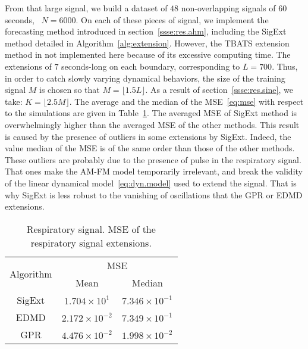 From that large signal, we build a dataset of $48$ non-overlapping signals of 60 seconds, \ie~$N=6000$. On each of these pieces of signal, we implement the forecasting method introduced in section~\ref{ssse:res.ahm}, including the {\sf SigExt} method detailed in Algorithm~\ref{alg:extension}. However, the TBATS extension method in not implemented here because of its excessive computing time. The extensions of $7$ seconds-long on each boundary, corresponding to $L =700$. Thus, in order to catch slowly varying dynamical behaviors, the size of the training signal $M$ is chosen so that $M=\lfloor 1.5L\rfloor$. As a result of section~\ref{ssse:res.sine}, we take: $K=\lfloor2.5M\rfloor$. The average and the median of the MSE~\eqref{eq:mse} with respect to the simulations are given in Table~\ref{tab:mse}. The averaged MSE of {\sf SigExt} method is overwhelmingly higher than the averaged MSE of the other methods. This result is caused by the presence of outliers in some extensions by {\sf SigExt}. Indeed, the value median of the MSE is of the same order than those of the other methods. These outliers are probably due to the presence of pulse in the respiratory signal. That ones make the AM-FM model temporarily irrelevant, and break the validity of the linear dynamical model~\eqref{eq:dyn.model} used to extend the signal. That is why {\sf SigExt} is less robust to the vanishing of oscillations that the GPR or EDMD extensions.

\begin{table}
\centering
\caption{Respiratory signal. MSE of the respiratory signal extensions.}
\begin{tabular}{|c||c|c|}
  \hline
   \multirow{2}{*}{Algorithm} & \multicolumn{2}{c|}{MSE} \\
   \cline{2-3}
      & Mean & Median\\
   \hhline{|=#=|=|}
   {\sf SigExt} & $1.704 \times 10^{1}$ & $7.346 \times 10^{-1}$ \\
   \hline
   EDMD & $2.172\times 10^{-2}$ & $7.349\times 10^{-1}$ \\
   \hline
   GPR & $4.476\times 10^{-2}$ & $1.998\times 10^{-2}$ \\
   \hline
\end{tabular}
\label{tab:mse}
\end{table} 

